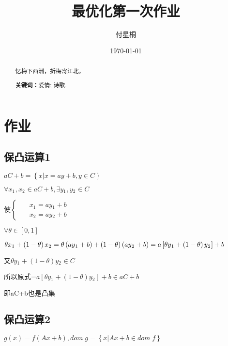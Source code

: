 \documentclass[12pt, a4paper, oneside, fontset=windows]{ctexart}
\title{\textbf{最优化第一次作业}}
\author{付星桐}
\date{\today}
\begin{document}
\pagestyle{empty}
\maketitle

\setcounter{page}{0}
\maketitle
\thispagestyle{empty}


\begin{abstract}
    忆梅下西洲，折梅寄江北。 
    \par\textbf{关键词：}爱情; 诗歌. 
\end{abstract}


\newpage
\setcounter{page}{1}
\tableofcontents
\newpage
\setcounter{page}{1}

\newpage
\section{作业}

\subsection{保凸运算1}
$aC+b=\left \{  x|x=ay+b,y\in C  \right \} $

$\forall x{_{1}}^{},x{_{2}}^{}\in aC+b,\exists y{_{1}}^{},y{_{2}}^{}\in C $

使$ \begin{cases}
    & \text{  } x{_{1}}^{}=ay{_{1}}^{}+b \\ 
    & \text{  } x{_{2}}^{}= ay{_{2}}^{}+b
    \end{cases}$

$ \forall \theta \in \left [  0,1\right ]$

$\theta x{_{1}}^{}+\left (1- \theta \right )x{_{2}}^{}=\theta \left (  ay{_{1}}^{}+b \\\right ) +\left (1- \theta \right ) \left ( ay{_{2}}^{}+b \\ \right )
=a\left [ \theta y{_{1}}^{}+\left (1- \theta \right )y{_{2}}^{}\right ]+b $

又$\theta y{_{1}}^{}+\left (1- \theta \right )y{_{2}}^{}\in C$

所以原式=$a\left [ \theta y{_{1}}^{}+\left (1- \theta \right )y{_{2}}^{}\right ]+b\in aC+b$

即aC+b也是凸集

\subsection{保凸运算2}
$g(x)=f(Ax+b) ,dom\; g=\left \{  x|Ax+b\in  dom\; f  \right \}$
\end{document}
